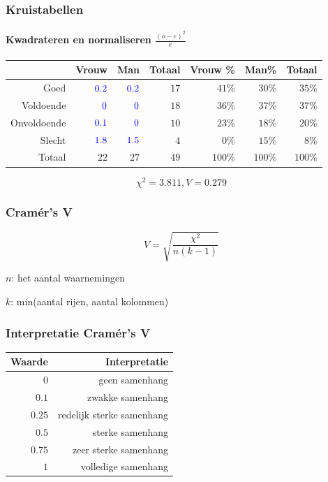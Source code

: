 \documentclass[aspectratio=169]{beamer}
\begin{document}
\begin{frame}
  \frametitle{Kruistabellen}
  \framesubtitle{Kwadrateren en normaliseren $\frac{(o-e)^2}{e}$}

  \begin{table}[h] \centering
    \begin{tabular}{@{}rrrrrrr@{}} \toprule
                  & Vrouw                   & Man                     & Totaal & Vrouw \% & Man\%   & Totaal  \\
      \midrule
      Goed        & $\textcolor{blue}{0.2}$ & $\textcolor{blue}{0.2}$ & $17$   & $41$\%   & $30$\%  & $35$\% \\
      Voldoende   & $\textcolor{blue}{0}$   & $\textcolor{blue}{0}$   & $18$   & $36$\%   & $37$\%  & $37$\% \\
      Onvoldoende & $\textcolor{blue}{0.1}$ & $\textcolor{blue}{0}$   & $10$   & $23$\%   & $18$\%  & $20$\% \\
      Slecht      & $\textcolor{blue}{1.8}$ & $\textcolor{blue}{1.5}$ & $4$    & $0$\%    & $15$\%  & $8$\%  \\
      Totaal      & $22$                    & $27$                    & $49$   & $100$\%  & $100$\% & $100$\%   \\
      \bottomrule
    \end{tabular}
  \end{table}
  \[ \chi^{2} = 3.811, V= 0.279 \]
\end{frame}

\begin{frame}
  \frametitle{Cramér's V}
  
  
  \[ V = \sqrt{\frac{\chi^2}{n (k - 1)}} \]
  
  $n$: het aantal waarnemingen
  
  $k$: min(aantal rijen, aantal kolommen)
\end{frame}

\begin{frame}
\frametitle{Interpretatie Cramér's V}

  \begin{table}[h] \centering
    \begin{tabular}{@{}rr@{}} \toprule
      Waarde & Interpretatie \\
      \midrule
      $0$ & geen samenhang \\
      $0.1$ &  zwakke samenhang \\
      $0.25$ & redelijk sterke samenhang \\
      $0.5$ & sterke samenhang \\
      $0.75$ & zeer sterke samenhang \\
      $1$ & volledige samenhang \\
      \bottomrule
    \end{tabular}
  \end{table}
\end{frame}
\end{document}
